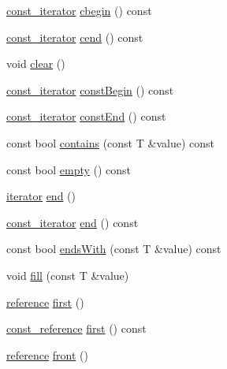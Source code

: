 \begin{DoxyCompactItemize}
\hyperlink{classprism_1_1_deque_afc2f71fd5b01e963e093f64cc4da94ec}{const\+\_\+iterator} \hyperlink{classprism_1_1_deque_a9d8d0e555a7113116643c8300bcc2085}{cbegin} () const 
\item 
\hyperlink{classprism_1_1_deque_afc2f71fd5b01e963e093f64cc4da94ec}{const\+\_\+iterator} \hyperlink{classprism_1_1_deque_a6514222d4c6ae657ab4e773c2d33246c}{cend} () const 
\item 
void \hyperlink{classprism_1_1_deque_ad644dd68be09f8070e8bf0821ddb6d9b}{clear} ()
\item 
\hyperlink{classprism_1_1_deque_afc2f71fd5b01e963e093f64cc4da94ec}{const\+\_\+iterator} \hyperlink{classprism_1_1_deque_a78472399e10815032ed009b3c50158c5}{const\+Begin} () const 
\item 
\hyperlink{classprism_1_1_deque_afc2f71fd5b01e963e093f64cc4da94ec}{const\+\_\+iterator} \hyperlink{classprism_1_1_deque_ade2ed985db1b24dd4633ca857d93f64f}{const\+End} () const 
\item 
const bool \hyperlink{classprism_1_1_deque_af86c689901918b3a07e606c644d63d37}{contains} (const T \&value) const 
\item 
const bool \hyperlink{classprism_1_1_deque_af1d67b91c768fe60b109ffe5f6dda745}{empty} () const 
\item 
\hyperlink{classprism_1_1_deque_af6fbdfa6e826f7f71b29f4d3cfb72ed1}{iterator} \hyperlink{classprism_1_1_deque_a37296b9dc29075a508028e7fe48cf269}{end} ()
\item 
\hyperlink{classprism_1_1_deque_afc2f71fd5b01e963e093f64cc4da94ec}{const\+\_\+iterator} \hyperlink{classprism_1_1_deque_a1a2ba376e9dfc337310efcf7774a16d3}{end} () const 
\item 
const bool \hyperlink{classprism_1_1_deque_acf572b1d8dba0708e794af62a1c594aa}{ends\+With} (const T \&value) const 
\item 
void \hyperlink{classprism_1_1_deque_aa40c9a9b312000990e335e141571e6c6}{fill} (const T \&value)
\item 
\hyperlink{classprism_1_1_deque_a93d8792e719ca205ce1b9ed5d8207c1d}{reference} \hyperlink{classprism_1_1_deque_a9b4c76aae18b2d465f6e066fa3262cc4}{first} ()
\item 
\hyperlink{classprism_1_1_deque_a8fcabfe6976606b91b4abef0e0353584}{const\+\_\+reference} \hyperlink{classprism_1_1_deque_a3c85aba9fc52d657e965a7a395c16658}{first} () const 
\item 
\hyperlink{classprism_1_1_deque_a93d8792e719ca205ce1b9ed5d8207c1d}{reference} \hyperlink{classprism_1_1_deque_a5aa3dba7ae441b15bed82bfe5fef72ff}{front} ()

\end{DoxyCompactItemize}

